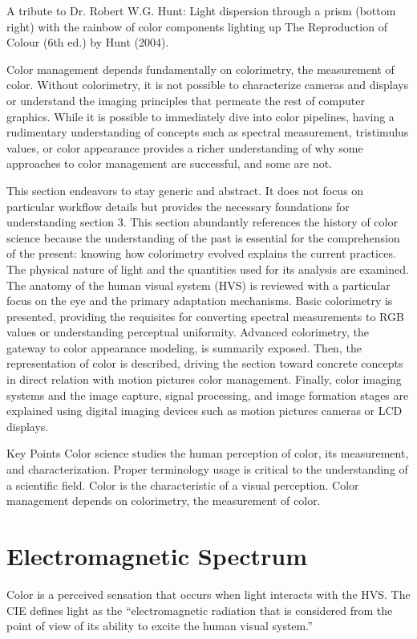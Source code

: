 A tribute to Dr. Robert W.G. Hunt: Light dispersion through a prism (bottom right) with the rainbow of color components lighting up The Reproduction of Colour (6th ed.) by Hunt (2004).

Color management depends fundamentally on colorimetry, the measurement of color. Without colorimetry, it is not possible to characterize cameras and displays or understand the imaging principles that permeate the rest of computer graphics. While it is possible to immediately dive into color pipelines, having a rudimentary understanding of concepts such as spectral measurement, tristimulus values, or color appearance provides a richer understanding of why some approaches to color management are successful, and some are not.

This section endeavors to stay generic and abstract. It does not focus on particular workflow details but provides the necessary foundations for understanding section 3. This section abundantly references the history of color science because the understanding of the past is essential for the comprehension of the present: knowing how colorimetry evolved explains the current practices. The physical nature of light and the quantities used for its analysis are examined. The anatomy of the human visual system (HVS) is reviewed with a particular focus on the eye and the primary adaptation mechanisms. Basic colorimetry is presented, providing the requisites for converting spectral measurements to RGB values or understanding perceptual uniformity. Advanced colorimetry, the gateway to color appearance modeling, is summarily exposed. Then, the representation of color is described, driving the section toward concrete concepts in direct relation with motion pictures color management. Finally, color imaging systems and the image capture, signal processing, and image formation stages are explained using digital imaging devices such as motion pictures cameras or LCD displays.

Key Points
Color science studies the human perception of color, its measurement, and characterization.
Proper terminology usage is critical to the understanding of a scientific field.
Color is the characteristic of a visual perception.
Color management depends on colorimetry, the measurement of color.

\section{Electromagnetic Spectrum}

Color is a perceived sensation that occurs when light interacts with the HVS. The CIE defines light as the “electromagnetic radiation that is considered from the point of view of its ability to excite the human visual system.”

